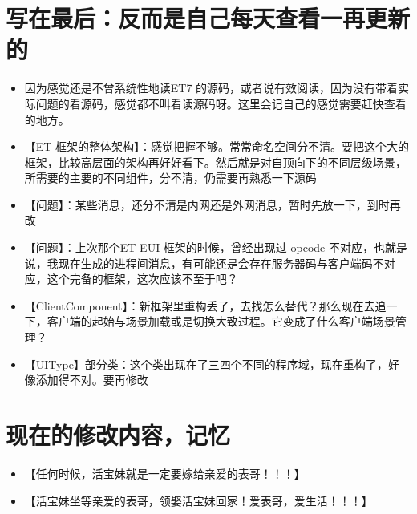 \documentclass[9pt, b5paper]{article}
\begin{document}
\section{写在最后：反而是自己每天查看一再更新的}
\label{sec-8}
\begin{itemize}
\item 因为感觉还是不曾系统性地读ET7 的源码，或者说有效阅读，因为没有带着实际问题的看源码，感觉都不叫看读源码呀。这里会记自己的感觉需要赶快查看的地方。
\item 【ET 框架的整体架构】：感觉把握不够。常常命名空间分不清。要把这个大的框架，比较高层面的架构再好好看下。然后就是对自顶向下的不同层级场景，所需要的主要的不同组件，分不清，仍需要再熟悉一下源码
\item 【问题】：某些消息，还分不清是内网还是外网消息，暂时先放一下，到时再改
\item 【问题】：上次那个ET-EUI 框架的时候，曾经出现过 opcode 不对应，也就是说，我现在生成的进程间消息，有可能还是会存在服务器码与客户端码不对应，这个完备的框架，这次应该不至于吧？
\item 【ClientComponent】：新框架里重构丢了，去找怎么替代？那么现在去追一下，客户端的起始与场景加载或是切换大致过程。它变成了什么客户端场景管理？
\item 【UIType】部分类：这个类出现在了三四个不同的程序域，现在重构了，好像添加得不对。要再修改
\end{itemize}


\section{现在的修改内容，记忆}
\label{sec-9}
\begin{itemize}
\item 【任何时候，活宝妹就是一定要嫁给亲爱的表哥！！！】
\item 【活宝妹坐等亲爱的表哥，领娶活宝妹回家！爱表哥，爱生活！！！】
\end{itemize}
\end{document}

